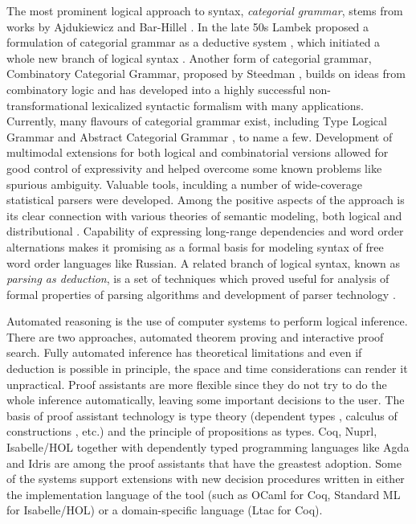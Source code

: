\documentclass[a4paper]{article}
\theoremstyle{example-style}
\begin{document}
The most prominent logical approach to syntax, \textit{categorial grammar}, stems from works by Ajdukiewicz and Bar-Hillel \parencite{ajdukiewicz1935,bar1953quasi}. In the late 50s Lambek proposed a formulation of categorial grammar as a deductive system \parencite{lambek1958mathematics,lambek1961calculus}, which initiated a whole new branch of logical syntax \parencite{moot2012logic}. Another form of categorial grammar, Combinatory Categorial Grammar, proposed by Steedman \parencite{steedman2000syntactic}, builds on ideas from combinatory logic and has developed into a highly successful non-transformational lexicalized syntactic formalism with many applications. Currently, many flavours of categorial grammar exist, including Type Logical Grammar \parencite{morrill1994type} and Abstract Categorial Grammar \parencite{degroot2001towards}, to name a few. Development of multimodal extensions for both logical and combinatorial versions allowed for good control of expressivity and helped overcome some known problems like spurious ambiguity. Valuable tools, inculding a number of wide-coverage statistical parsers \parencite{curran2007linguistically,white2008open} were developed. Among the positive aspects of the approach is its clear connection with various theories of semantic modeling, both logical \parencite{steedman2000syntactic,bos2008wide,baldridge2002coupling} and distributional \parencite{maillard2014type}. Capability of expressing long-range dependencies and word order alternations makes it promising as a formal basis for modeling syntax of free word order languages like Russian. A related branch of logical syntax, known as \textit{parsing as deduction}, is a set of techniques which proved useful for analysis of formal properties of parsing algorithms and development of parser technology \parencite{pereira1983parsing,kallmeyer2010parsing}.

Automated reasoning is the use of computer systems to perform logical inference. There are two approaches, automated theorem proving and interactive proof search. Fully automated inference has theoretical limitations and even if deduction is possible in principle, the space and time considerations can render it unpractical. Proof assistants are more flexible since they do not try to do the whole inference automatically, leaving some important decisions to the user. The basis of proof assistant technology is type theory (dependent types \parencite{martinloef1984}, calculus of constructions \parencite{coquand1988calculus}, etc.) and the principle of propositions as types. Coq, Nuprl, Isabelle/HOL together with dependently typed programming languages like Agda and Idris are among the proof assistants that have the greastest adoption. Some of the systems support extensions with new decision procedures written in either the implementation language of the tool (such as OCaml for Coq, Standard ML for Isabelle/HOL) or a  domain-specific language (Ltac for Coq).
\end{document}

